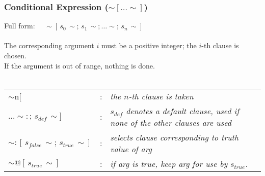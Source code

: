 \documentclass{article}
\begin{document}
\subsubsection{Conditional Expression ($\sim[ \ldots \sim]$)}
Full form: $\quad \sim\![ \, s_0 \, \sim; \, s_1 \, \sim; \ldots \sim; \, s_n \, \sim]$ \\
\\
The corresponding argument $i$ must be a positive integer; the $i$-th clause is chosen. \\
If the argument is out of range, nothing is done. \\
\\
\begin{tabular}{llll}
  $\sim$n[ & : & {\em the $n$-th clause is taken} \\
  $\ldots \sim:; \, s_{def} \, \sim]$ & : & {\em $s_{def}$ denotes a default clause, 
                                     used if none of the other clauses are used} \\
  $\sim:\![ \, s_{false} \, \sim; \, s_{true} \, \sim]$ &:& {\em selects clause corresponding to truth value of {\em arg}} \\
  $\sim\!@[ \, s_{true} \, \sim]$ &:& {\em if {\em arg} is true, keep {\em arg} for use by $s_{true}$.} \\
\end{tabular}
\end{document}
